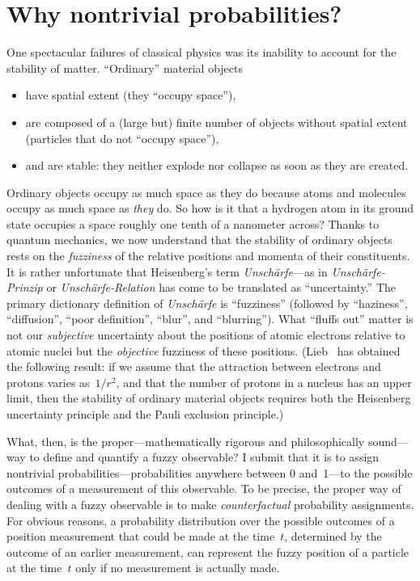 \documentclass[12pt]{article}
\newcommand{\bi}{\begin{itemize}}
\newcommand{\ei}{\end{itemize}}
\begin{document}
\section{Why nontrivial probabilities?}
\label{SECwhyprobas}One spectacular failures of classical physics was its inability to account for the stability of matter. ``Ordinary'' material objects
\bi
\item have spatial extent (they ``occupy space''),
\item are composed of a (large but) finite number of objects without spatial extent (particles that do not ``occupy space''),
\item and are stable: they neither explode nor collapse as soon as they are created.
\ei
Ordinary objects occupy as much space as they do because atoms and molecules occupy as much space as {\it they\/} do. So how is it that a hydrogen atom in its ground state occupies a space roughly one tenth of a nanometer across? Thanks to quantum mechanics, we now understand that the stability of ordinary objects rests on the {\it fuzziness\/} of the relative positions and momenta of their constituents. It is rather unfortunate that Heisenberg's term \textit{Unsch\"arfe}---as in \textit{Unsch\"arfe-Prinzip} or \textit{Unsch\"arfe-Relation} has come to be translated as ``uncertainty.'' The primary dictionary definition of \textit{Unsch\"arfe} is ``fuzziness'' (followed by ``haziness'', ``diffusion'', ``poor definition'', ``blur'', and ``blurring''). What ``fluffs out'' matter is not our \textit{subjective} uncertainty about the positions of atomic electrons relative to atomic nuclei but the \textit{objective} fuzziness of these positions. (Lieb~\cite{Lieb} has obtained the following result: if we assume that the attraction between electrons and protons varies as~$1/r^2$, and that the number of protons in a nucleus has an upper limit, then the stability of ordinary material objects requires both the Heisenberg uncertainty principle and the Pauli exclusion principle.)

What, then, is the proper---mathematically rigorous and philosophically sound---way to define and quantify a fuzzy observable? I submit that it is to assign nontrivial probabilities---probabilities anywhere between 0 and~1---to the possible outcomes of a measurement of this observable. To be precise, the proper way of dealing with a fuzzy observable is to make \textit{counterfactual} probability assignments. For obvious reasons, a probability distribution over the possible outcomes of a position measurement that could be made at the time~$t$, determined by the outcome of an earlier measurement, can represent the fuzzy position of a particle at the time~$t$ only if no measurement is actually made.
\end{document}
